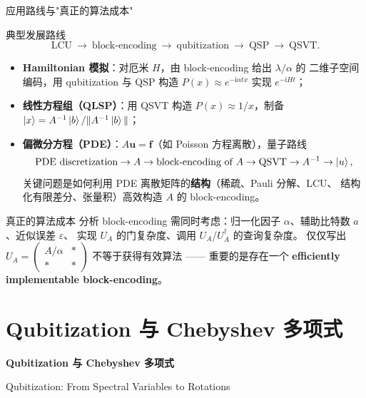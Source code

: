 \documentclass[aspectratio=169,9pt]{ctexbeamer}
\newcommand{\eps}{\varepsilon}
\newcommand{\ii}{\mathrm{i}}
\newcommand{\smallcite}[1]{\par\vspace{1.2mm}{\scriptsize\color{graytext}#1}}
\begin{document}
\begin{frame}{应用路线与"真正的算法成本"}
\begin{keybox}{典型发展路线}
\[
\text{LCU}\ \to\ \text{block-encoding}\ \to\ \text{qubitization}\ \to\ \text{QSP}\ \to\ \text{QSVT}.
\]
\begin{itemize}
\item \textbf{Hamiltonian 模拟}：对厄米 $H$，由 block-encoding 给出 $\lambda/\alpha$ 的
二维子空间编码，用 qubitization 与 QSP 构造 $P(x)\approx e^{-\ii\alpha tx}$ 实现 $e^{-\ii Ht}$；
\item \textbf{线性方程组（QLSP）}：用 QSVT 构造 $P(x)\approx1/x$，制备
$\ket x=A^{-1}\ket b/\|A^{-1}\ket b\|$；
\item \textbf{偏微分方程（PDE）}：$A\mathbf u=\mathbf f$（如 Poisson 方程离散），量子路线
\[
\text{PDE discretization}\to A\to\text{block-encoding of }A\to\text{QSVT}\to A^{-1}\to\ket u,
\]
关键问题是如何利用 PDE 离散矩阵的\textbf{结构}（稀疏、Pauli 分解、LCU、
结构化有限差分、张量积）高效构造 $A$ 的 block-encoding。
\end{itemize}
\end{keybox}
\begin{warnbox}{真正的算法成本}
分析 block-encoding 需同时考虑：归一化因子 $\alpha$、辅助比特数 $a$、近似误差 $\eps$、
实现 $U_A$ 的门复杂度、调用 $U_A$/$U_A^\dagger$ 的查询复杂度。
仅仅写出 $U_A=\begin{pmatrix}A/\alpha&\ast\\\ast&\ast\end{pmatrix}$ 不等于获得有效算法
—— 重要的是存在一个 \textbf{efficiently implementable block-encoding}。
\end{warnbox}
\smallcite{Model 3 笔记第 4.7 节。}
\end{frame}

\section{Qubitization 与 Chebyshev 多项式}
\begin{frame}[plain]
\centering\vspace{2.0cm}
{\Huge\bfseries\color{navy} Qubitization 与 Chebyshev 多项式}\par\vspace{4mm}
{\large Qubitization: From Spectral Variables to Rotations}
\end{frame}
\end{document}
